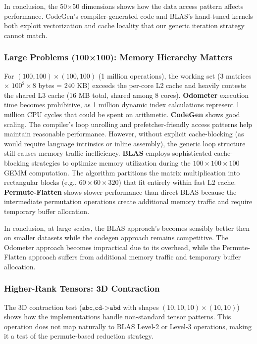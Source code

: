 \documentclass[binding=0.6cm]{sapthesis}
\begin{document}
In conclusion, the 50×50 dimensions shows how the data access pattern affects performance. CodeGen's compiler-generated code and BLAS's hand-tuned kernels both exploit vectorization and cache locality that our generic iteration strategy cannot match.

\subsubsection{Large Problems (100×100): Memory Hierarchy Matters}

For $(100, 100) \times (100, 100)$ (1 million operations), the working set (3 matrices × $100^2 \times 8$ bytes = 240 KB) exceeds the per-core L2 cache and heavily contests the shared L3 cache (16 MB total, shared among 8 cores).
\textbf {Odometer} execution time becomes prohibitive, as 1 million dynamic index calculations represent 1 million CPU cycles that could be spent on arithmetic.
\textbf {CodeGen} shows good scaling. The compiler's loop unrolling and prefetcher-friendly access patterns help maintain reasonable performance. However, without explicit cache-blocking (as would require language intrinsics or inline assembly), the generic loop structure still causes memory traffic inefficiency.
\textbf {BLAS} employs sophisticated cache-blocking strategies to optimize memory utilization during the $100 \times 100 \times 100$ GEMM computation. The algorithm partitions the matrix multiplication into rectangular blocks (e.g., $60 \times 60 \times 320$) that fit entirely within fast L2 cache.
\textbf {Permute-Flatten} shows slower performance than direct BLAS because the intermediate permutation operations create additional memory traffic and require temporary buffer allocation.

In conclusion, at large scales, the BLAS approach's becomes sensibly better then on smaller datasets while the codegen approach remains competitive. The Odometer approach becomes impractical due to its overhead, while the Permute-Flatten approach suffers from additional memory traffic and temporary buffer allocation.

\subsubsection{Higher-Rank Tensors: 3D Contraction}

The 3D contraction test ($\texttt{abc,cd->abd}$ with shapes $(10, 10, 10) \times (10, 10)$) shows how the implementations handle non-standard tensor patterns. This operation does not map naturally to BLAS Level-2 or Level-3 operations, making it a test of the permute-based reduction strategy.
\end{document}
